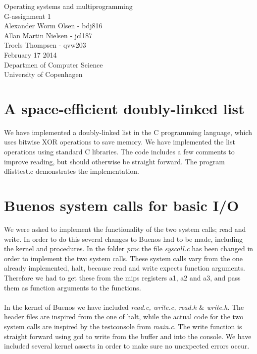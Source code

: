 \documentclass[12pt,a4paper,danish]{article}
\begin{document}
\begin{titlepage}
    \vspace*{\fill}
    \begin{center}
      {\Huge Operating systems and multiprogramming}\\[0.7cm]
      {\huge G-assignment 1}\\[0.7cm]
      {\large Alexander Worm Olsen - bdj816}\\[0.4cm]
      {\large Allan Martin Nielsen - jcl187}\\[0.4cm]
      {\large Troels Thompsen - qvw203}\\[0.4cm]
      {\small February 17 2014}\\[0.3cm] 
      {\small Departmen of Computer Science}\\
      {\small University of Copenhagen}
    \end{center}
    \vspace*{\fill}
\end{titlepage}

\section{A space-efficient doubly-linked list}
We have implemented a doubly-linked list in the C programming language, which uses bitwise XOR operations to save memory. We have implemented the list operations using standard C libraries. The code includes a few comments to improve reading, but should otherwise be straight forward. The program dlisttest.c demonstrates the implementation. 

\section{Buenos system calls for basic I/O}
We were asked to implement the functionality of the two system calls; read and write. In order to do this several changes to Buenos had to be made, including the kernel and procedures. In the folder \textit{proc} the file \textit{syscall.c} has been changed in order to implement the two system calls. These system calls vary from the one already implemented, halt, because read and write expects function arguments. Therefore we had to get these from the mips registers a1, a2 and a3, and pass them as function arguments to the functions.\\\\
In the kernel of Buenos we have included \textit{read.c, write.c, read.h} \& \textit{write.h}. The header files are inspired from the one of halt, while the actual code for the two system calls are inspired by the testconsole from \textit{main.c}. The write function is straight forward using gcd to write from the buffer and into the console. We have included several kernel asserts in order to make sure no unexpected errors occur.
\end{document}
